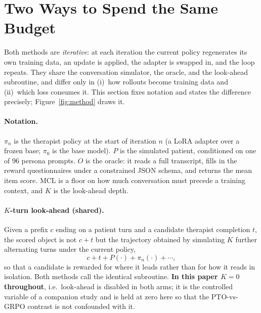 \section{Two Ways to Spend the Same Budget}
\label{sec:method}

Both methods are \emph{iterative}: at each iteration the current policy regenerates its own
training data, an update is applied, the adapter is swapped in, and the loop repeats. They
share the conversation simulator, the oracle, and the look-ahead subroutine, and differ
only in (i)~how rollouts become training data and (ii)~which loss consumes it. This section
fixes notation and states the difference precisely; Figure~\ref{fig:method} draws it.

\paragraph{Notation.}
$\pi_n$ is the therapist policy at the start of iteration $n$ (a LoRA adapter over a frozen
base; $\pi_0$ is the base model). $P$ is the simulated patient, conditioned on one of 96
persona prompts. $O$ is the oracle: it reads a full transcript, fills in the reward
questionnaires under a constrained JSON schema, and returns the mean item score.
$\mathrm{MCL}$ is a floor on how much conversation must precede a training context, and
$K$ is the look-ahead depth.

\paragraph{$K$-turn look-ahead (shared).}
Given a prefix $c$ ending on a patient turn and a candidate therapist completion $t$, the
scored object is not $c\!+\!t$ but the trajectory obtained by simulating $K$ further
alternating turns under the current policy,
\[
  c + t + P(\cdot) + \pi_n(\cdot) + \cdots ,
\]
so that a candidate is rewarded for where it leads rather than for how it reads in
isolation. Both methods call the identical subroutine. \textbf{In this paper $K=0$
throughout}, i.e.\ look-ahead is disabled in both arms; it is the controlled variable of a
companion study and is held at zero here so that the PTO-vs-GRPO contrast is not confounded
with it.

